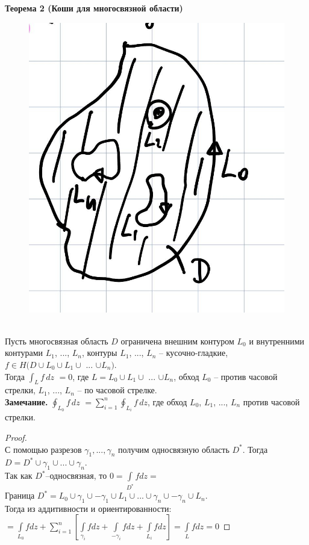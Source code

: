 \textbf{Теорема 2 (Коши для многосвязной области)}\\
\begin{figure}[!ht]
\includegraphics[scale=0.2]{answers/img/pic3.jpg}
\end{figure}\\
Пусть многосвязная область $D$ ограничена внешним контуром $L_0$ и внутренними контурами $L_1$, ..., $L_n$, контуры $L_1$, ..., $L_n$ -- кусочно-гладкие, $f \in H(D \cup L_0 \cup L_1 \cup$ ... $\cup L_n)$.\\
Тогда \(\int_L f\, dz\) $= 0$, где $L = L_0 \cup L_1 \cup$ ... $\cup L_n$, обход $L_0$ -- против часовой стрелки, $L_1$, ..., $L_n$ -- по часовой стрелке.\\
\textbf{Замечание.} \(\oint_{L_0} f\, dz\) 
$= \sum_{i = 1}^{n}$\(\oint_{L_i} f\, dz\), где обход $L_0$, $L_1$, ..., $L_n$ против часовой стрелки.


\begin{proof}
    \ \\
    С помощью разрезов $\gamma_1, ..., \gamma_n$ получим односвязную область $D^*$. Тогда $D=D^*\cup\gamma_1\cup...\cup\gamma_n$.\\
    Так как $D^*$--односвязная, то $0=\int\limits_{D^*}fdz = $\\
    Граница $D^* = L_0\cup\gamma_1\cup-\gamma_1\cup L_1 \cup...\cup\gamma_n\cup-\gamma_n\cup L_n$.\\
    Тогда из аддитивности и ориентированности:\\
    $=\int\limits_{L_0}fdz+\sum_{i=1}^n\left[ \int\limits_{\gamma_i}fdz+\int\limits_{-\gamma_i}fdz+\int\limits_{L_i}fdz \right] = \int\limits_{L}fdz=0$
\end{proof}

